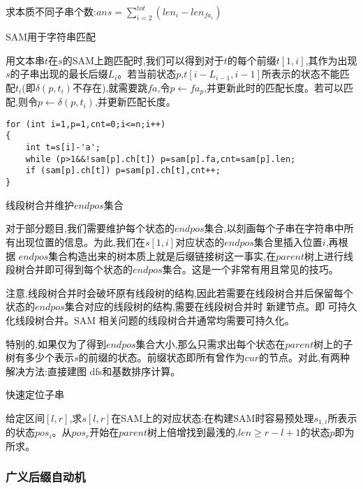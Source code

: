 \documentclass[a4paper]{ctexart}
\begin{document}
求本质不同子串个数:$ans=\sum\limits_{i=2}^{tot}(len_i-len_{fa_i})$

SAM用于字符串匹配

用文本串$t$在$s$的SAM上跑匹配时,我们可以得到对于$t$的每个前缀$t[1,i]$,其作为出现$s$的子串出现的最长后缀$L_i$。若当前状态$p$,$t[i-L_{i-1},i-1]$所表示的状态不能匹配$t_i$(即$\delta(p,t_i)$不存在),就需要跳$fa$,令$p\leftarrow fa_p$,并更新此时的匹配长度。若可以匹配,则令$p\leftarrow \delta(p,t_i)$,并更新匹配长度。

\begin{lstlisting}
for (int i=1,p=1,cnt=0;i<=n;i++)
{
    int t=s[i]-'a';
    while (p>1&&!sam[p].ch[t]) p=sam[p].fa,cnt=sam[p].len;
    if (sam[p].ch[t]) p=sam[p].ch[t],cnt++;
}
\end{lstlisting}

线段树合并维护$endpos$集合

对于部分题目,我们需要维护每个状态的$endpos$集合,以刻画每个子串在字符串中所有出现位置的信息。为此,我们在$s[1,i]$对应状态的$endpos$集合里插入位置$i$,再根据 $endpos$集合构造出来的树本质上就是后缀链接树这一事实,在$parent$树上进行线段树合并即可得到每个状态的$endpos$集合。这是一个非常有用且常见的技巧。

注意,线段树合并时会破坏原有线段树的结构,因此若需要在线段树合并后保留每个状态的$endpos$集合对应的线段树的结构,需要在线段树合并时 新建节点。即 可持久化线段树合并。SAM 相关问题的线段树合并通常均需要可持久化。

特别的,如果仅为了得到$endpos$集合大小,那么只需求出每个状态在$parent$树上的子树有多少个表示$s$的前缀的状态。前缀状态即所有曾作为$cur$的节点。对此,有两种解决方法:直接建图 dfs和基数排序计算。

快速定位子串

给定区间$[l,r]$,求$s[l,r]$在SAM上的对应状态:在构建SAM时容易预处理$s_{1,i}$所表示的状态$pos_i$。从$pos_r$开始在$parent$树上倍增找到最浅的,$len\ge r-l+1$的状态$p$即为所求。

\subsubsection{广义后缀自动机}
\end{document}
